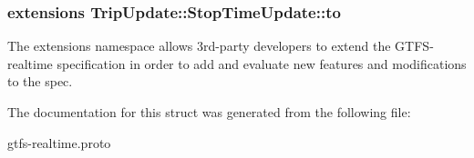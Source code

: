 \subsubsection[{\texorpdfstring{to}{to}}]{\setlength{\rightskip}{0pt plus 5cm}extensions Trip\+Update\+::\+Stop\+Time\+Update\+::to}\hypertarget{structTripUpdate_1_1StopTimeUpdate_ae4536522e5c97e4a800017600600a7dc}{}\label{structTripUpdate_1_1StopTimeUpdate_ae4536522e5c97e4a800017600600a7dc}


The extensions namespace allows 3rd-\/party developers to extend the G\+T\+F\+S-\/realtime specification in order to add and evaluate new features and modifications to the spec. 



The documentation for this struct was generated from the following file\+:\begin{DoxyCompactItemize}
\item 
gtfs-\/realtime.\+proto\end{DoxyCompactItemize}
